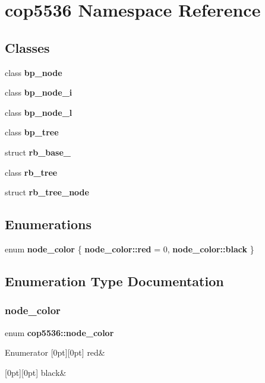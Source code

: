 \section{cop5536 Namespace Reference}
\label{namespacecop5536}
\subsection*{Classes}
\begin{DoxyCompactItemize}
\item 
class \textbf{ bp\+\_\+node}
\item 
class \textbf{ bp\+\_\+node\+\_\+i}
\item 
class \textbf{ bp\+\_\+node\+\_\+l}
\item 
class \textbf{ bp\+\_\+tree}
\item 
struct \textbf{ rb\+\_\+base\+\_\+}
\item 
class \textbf{ rb\+\_\+tree}
\item 
struct \textbf{ rb\+\_\+tree\+\_\+node}
\end{DoxyCompactItemize}
\subsection*{Enumerations}
\begin{DoxyCompactItemize}
\item 
enum \textbf{ node\+\_\+color} \{ \textbf{ node\+\_\+color\+::red} = 0, 
\textbf{ node\+\_\+color\+::black}
 \}
\end{DoxyCompactItemize}


\subsection{Enumeration Type Documentation}
\mbox{\label{namespacecop5536_ae51dda62aa0378e4785101f1489bbff5}} 
\subsubsection{node\_color}
{\footnotesize\ttfamily enum \textbf{ cop5536\+::node\+\_\+color}\hspace{0.3cm}{\ttfamily [strong]}}

\begin{DoxyEnumFields}{Enumerator}
[0pt][0pt]{}\mbox{\label{namespacecop5536_ae51dda62aa0378e4785101f1489bbff5abda9643ac6601722a28f238714274da4}} 
red&\\
\hline

[0pt][0pt]{}\mbox{\label{namespacecop5536_ae51dda62aa0378e4785101f1489bbff5a1ffd9e753c8054cc61456ac7fac1ac89}} 
black&\\
\hline

\end{DoxyEnumFields}
